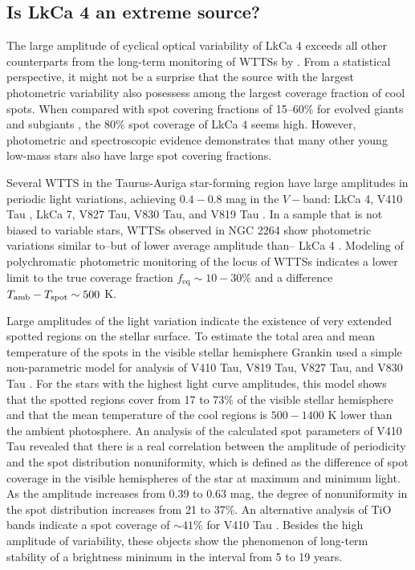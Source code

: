 \documentclass[twocolumn]{emulateapj}%
\newcommand{\name}{LkCa 4 }
\begin{document}
\subsection{Is \name an extreme source?}
The large amplitude of cyclical optical variability of LkCa 4 exceeds all other counterparts from the long-term monitoring of WTTSs by \citet{grankin08}.  From a statistical perspective, it might not be a surprise that the source with the largest photometric variability also posessess among the largest coverage fraction of cool spots.  When compared with spot covering fractions of 15--60\% for evolved giants and subgiants \citep{chugainov76,berdyugina05}, the 80\% spot coverage of LkCa 4 seems high.  However, photometric and spectroscopic evidence demonstrates that many other young low-mass stars also have large spot covering fractions.

Several WTTS in the Taurus-Auriga star-forming region have large amplitudes in periodic light variations, achieving $0.4-0.8$ mag in the $V-$band: LkCa 4, V410 Tau \citep{herbst89}, LkCa 7, V827 Tau, V830 Tau, and V819 Tau \citep{grankin08}.  In a sample that is not biased to variable stars, WTTSs observed in NGC 2264 show photometric variations similar to--but of lower average amplitude than-- LkCa 4 \citep{cody14,venuti15}.  Modeling of polychromatic photometric monitoring of the locus of WTTSs indicates a lower limit to the true coverage fraction $f_{\mathrm{eq}}\sim10-30\%$ and a difference $T_\textrm{amb}-T_\textrm{spot}\sim500$ K. 

Large amplitudes of the light variation indicate the existence of very extended spotted regions on the stellar surface. To estimate the total area and mean temperature of the spots in the visible stellar hemisphere Grankin used a simple non-parametric model for analysis of V410 Tau, V819 Tau, V827 Tau, and V830 Tau \citep{grankin98,grankin99}.  For the stars with the highest light curve amplitudes, this model shows that the spotted regions cover from 17 to 73\% of the visible stellar hemisphere and that the mean temperature of the cool regions is $500-1400$ K lower than the ambient photosphere.  An analysis of the calculated spot parameters of V410 Tau revealed that there is a real correlation between the amplitude of periodicity and the spot distribution
nonuniformity, which is defined as the difference of spot coverage in the visible hemispheres of the star at maximum and minimum light. As the amplitude increases from 0.39 to 0.63 mag, the degree of nonuniformity in the spot distribution increases from 21 to 37\%.  An alternative analysis of TiO bands indicate a spot coverage of $\sim 41$\% for V410 Tau \citep{petrov94}.  Besides the high amplitude of variability, these objects show the phenomenon of long-term stability of a brightness minimum in the interval from 5 to 19 years.
\end{document}
